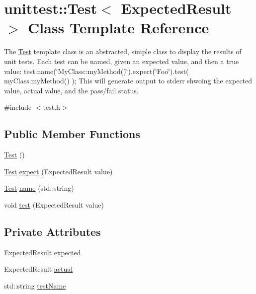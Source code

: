 \hypertarget{classunittest_1_1Test}{
\section{unittest::Test$<$ ExpectedResult $>$ Class Template Reference}
\label{classunittest_1_1Test}
}


The \hyperlink{classunittest_1_1Test}{Test} template class is an abstracted, simple class to display the results of unit tests. Each test can be named, given an expected value, and then a true value: test.name(\char`\"{}MyClass::myMethod()\char`\"{}).expect(\char`\"{}Foo\char`\"{}).test( myClass.myMethod() ); This will generate output to stderr shwoing the expected value, actual value, and the pass/fail status.  




{\ttfamily \#include $<$test.h$>$}

\subsection*{Public Member Functions}
\begin{DoxyCompactItemize}
\item 
\hyperlink{classunittest_1_1Test_ab0710bc26685edad9d465b9281c6cc9f}{Test} ()
\item 
\hyperlink{classunittest_1_1Test}{Test} \hyperlink{classunittest_1_1Test_a1903e808d53a1fd1c7550f8af6a0bdaf}{expect} (ExpectedResult value)
\item 
\hyperlink{classunittest_1_1Test}{Test} \hyperlink{classunittest_1_1Test_a6a0f892a9db7f6c11b1b237f1b46e487}{name} (std::string)
\item 
void \hyperlink{classunittest_1_1Test_a68e6b4f7a18747533b9000640a8e0abb}{test} (ExpectedResult value)
\end{DoxyCompactItemize}
\subsection*{Private Attributes}
\begin{DoxyCompactItemize}
\item 
ExpectedResult \hyperlink{classunittest_1_1Test_a4c5c14e9919c00b53f973cac370455b0}{expected}
\item 
ExpectedResult \hyperlink{classunittest_1_1Test_a94ffef90be10c89de6905724d007065e}{actual}
\item 
std::string \hyperlink{classunittest_1_1Test_a864ad88ceccb86bbf71b33582495dfac}{testName}
\end{DoxyCompactItemize}


